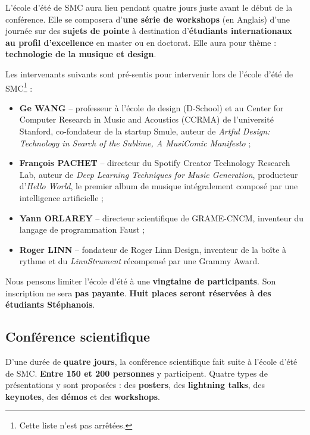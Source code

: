 \documentclass[fontsize=12pt]{scrartcl} %
\numberwithin{equation}{section} %
\numberwithin{table}{section} %
\begin{document}
L'école d'été de SMC aura lieu pendant quatre jours juste avant le début de la conférence. Elle se composera d'\textbf{une série de workshops} (en Anglais) d'une journée sur des \textbf{sujets de pointe} à destination d'\textbf{étudiants internationaux au profil d'excellence} en master ou en doctorat. Elle aura pour thème : \textbf{technologie de la musique et design}.

Les intervenants suivants sont pré-sentis pour intervenir lors de l'école d'été de SMC\footnote{Cette liste n'est pas arrêtées.} :

\begin{itemize}
  \item \textbf{Ge WANG} -- professeur à l'école de design (D-School) et au Center for Computer Research in Music and Acoustics (CCRMA) de l'université Stanford, co-fondateur de la startup Smule, auteur de \textit{Artful Design: Technology in Search of the Sublime, A MusiComic Manifesto} ;
  \item \textbf{François PACHET} -- directeur du Spotify Creator Technology Research Lab, auteur de \textit{Deep Learning Techniques for Music Generation}, producteur d'\textit{Hello World}, le premier album de musique intégralement composé par une intelligence artificielle ;
  \item \textbf{Yann ORLAREY} -- directeur scientifique de GRAME-CNCM, inventeur du langage de programmation Faust ;
  \item \textbf{Roger LINN} -- fondateur de Roger Linn Design, inventeur de la boîte à rythme et du \textit{LinnStrument} récompensé par une Grammy Award.
\end{itemize} 

Nous pensons limiter l'école d'été à une \textbf{vingtaine de participants}. Son inscription ne sera \textbf{pas payante}. \textbf{Huit places seront réservées à des étudiants Stéphanois}. 

\subsection{Conférence scientifique}

D'une durée de \textbf{quatre jours}, la conférence scientifique fait suite à l'école d'été de SMC. \textbf{Entre 150 et 200 personnes} y participent. Quatre types de présentations y sont proposées : des \textbf{posters}, des \textbf{lightning talks}, des \textbf{keynotes}, des \textbf{démos} et des \textbf{workshops}. 
\end{document}
